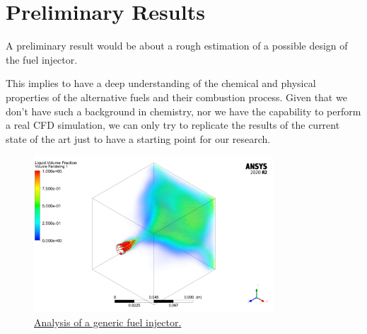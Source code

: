 \section{Preliminary Results}
\label{sec:preliminary_results}

A preliminary result would be about a rough estimation of a possible design of the fuel injector.

This implies to have a deep understanding of the chemical and physical properties of the alternative fuels and their combustion process.
Given that we don't have such a background in chemistry, nor we have the capability to perform a real CFD simulation, we can only try to replicate the results of the current state of the art just to have a starting point for our research.

\begin{figure}[H]
    \centering
    \includegraphics[width=0.8\textwidth]{img/injector_analysis_example.png}
    \caption{\href{https://www.mr-cfd.com/shop/fuel-injector-cfd-simulation-three-phase-flow/}{Analysis of a generic fuel injector.}}
    \label{fig:fuel_injector_analysis}
\end{figure}
